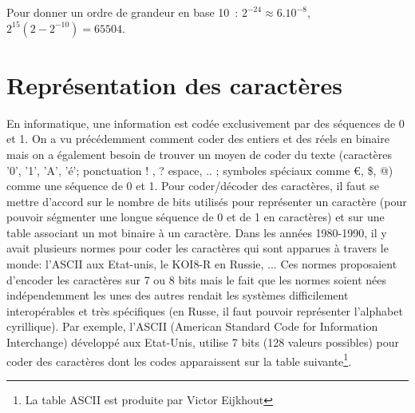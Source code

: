 Pour donner un ordre de grandeur en base 10~: $2^{-24} \approx 6.10^{-8}$, $2^{15} (2-2^{-10}) = 65504$.





\section{Représentation des caractères}

En informatique, une information est codée exclusivement par des séquences de 0 et 1. On a vu précédemment comment coder des entiers et des réels en binaire mais on a également besoin de trouver un moyen de coder du texte (caractères '0', '1', 'A', 'é'; ponctuation ! , ? espace, .. ; symboles spéciaux comme \euro, \$, @) comme une séquence de 0 et 1. Pour coder/décoder des caractères, il faut se mettre d'accord sur le nombre de bits utilisés pour représenter un caractère (pour pouvoir ségmenter une longue séquence de 0 et de 1 en caractères) et sur une table associant un mot binaire à un caractère. Dans les années 1980-1990, il y avait plusieurs normes pour coder les caractères qui sont apparues à travers le monde: l'ASCII aux Etat-unis, le KOI8-R en Russie, ... Ces normes proposaient d'encoder les caractères sur 7 ou 8 bits mais le fait que les normes soient nées indépendemment les unes des autres rendait les systèmes difficilement interopérables et très spécifiques (en Russe, il faut pouvoir représenter l'alphabet cyrillique). Par exemple, l'ASCII (American Standard Code for Information Interchange) développé aux Etat-Unis, utilise 7 bits (128 valeurs possibles) pour coder des caractères dont les codes apparaissent sur la table suivante\footnote{La table ASCII est produite par Victor Eijkhout}. 

